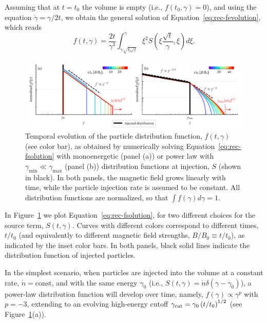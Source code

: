 Assuming that at $t=t_0$ the volume is empty (i.e., $f(t_0,\gamma)=0$), and using the equation $\dot{\gamma}=\gamma/2t$, we obtain the general solution of Equation~\eqref{eq:rec-fevolution}, which reads
\begin{equation}
    \label{eq:rec-fsolution}
    f(t,\gamma)=\frac{2t}{\gamma^3}\int_{\gamma\sqrt{t_0/t}}^{\gamma}\xi^2 S\left(\xi\frac{\sqrt{t}}{\gamma},\xi\right)d\xi.
\end{equation}

\begin{figure}[tb]
    \includegraphics[width=\textwidth]{figures/ch2-reconnection/fig2.pdf}
    \caption{Temporal evolution of the particle distribution function, $f(t, \gamma)$ (see color bar), as obtained by numerically solving Equation~\eqref{eq:rec-fsolution} with monoenergetic (panel (a)) or power law with $\gamma_{\min} \ll \gamma_{\max}$ (panel (b)) distribution functions at injection, $S$ (shown in black). In both panels, the magnetic field grows linearly with time, while the particle injection rate is assumed to be constant. All distribution functions are normalized, so that $\int f(\gamma)d\gamma = 1$. }
    \label{fig:rec-theory}
\end{figure}

In Figure~\ref{fig:rec-theory} we plot Equation~\eqref{eq:rec-fsolution}, for two different choices for the source term, $S(t,\gamma)$. Curves with different colors correspond to different times, $t/t_0$ (and equivalently to different magnetic field strengths, $B/B_0\equiv t/t_0$), as indicated by the inset color bars. In both panels, black solid lines indicate the distribution function of injected particles.

In the simplest scenario, when particles are injected into the volume at a constant rate, $\dot{n}=\mathrm{const}$, and with the same energy $\gamma_0$ (i.e., $S(t, \gamma)=\dot{n}\delta(\gamma - \gamma_0)$), a power-law distribution function  will develop over time, namely, $f(\gamma)\propto \gamma^{p}$ with $p=-3$, extending to an evolving high-energy cutoff $\gamma_{\rm cut}=\gamma_0\left(t/t_0\right)^{1/2}$ (see Figure~\ref{fig:rec-theory}(a)). 

